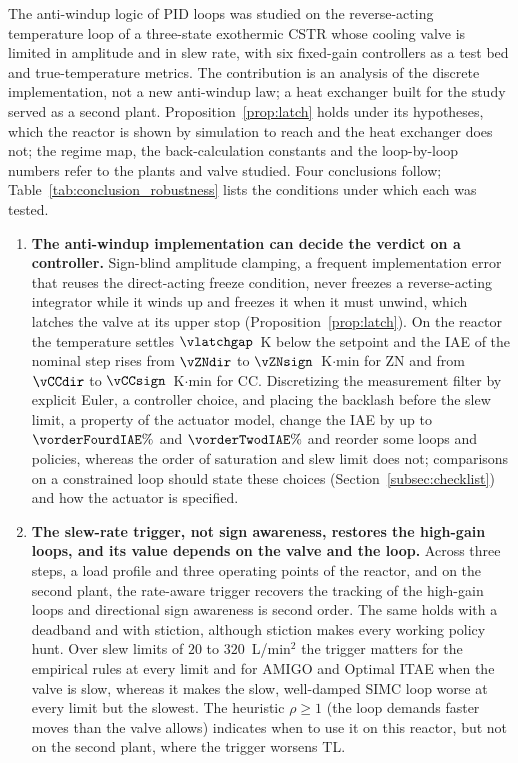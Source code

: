 The anti-windup logic of PID loops was studied on the reverse-acting temperature loop of a three-state exothermic CSTR whose cooling valve is limited in amplitude and in slew rate, with six fixed-gain controllers as a test bed and true-temperature metrics. The contribution is an analysis of the discrete implementation, not a new anti-windup law; a heat exchanger built for the study served as a second plant. Proposition~\ref{prop:latch} holds under its hypotheses, which the reactor is shown by simulation to reach and the heat exchanger does not; the regime map, the back-calculation constants and the loop-by-loop numbers refer to the plants and valve studied. Four conclusions follow; Table~\ref{tab:conclusion_robustness} lists the conditions under which each was tested.
\begin{enumerate}
    \item \textbf{The anti-windup implementation can decide the verdict on a controller.} Sign-blind amplitude clamping, a frequent implementation error that reuses the direct-acting freeze condition, never freezes a reverse-acting integrator while it winds up and freezes it when it must unwind, which latches the valve at its upper stop (Proposition~\ref{prop:latch}). On the reactor the temperature settles $\vlatchgap$~K below the setpoint and the IAE of the nominal step rises from $\vZNdir$ to $\vZNsign$~K$\cdot$min for ZN and from $\vCCdir$ to $\vCCsign$~K$\cdot$min for CC. Discretizing the measurement filter by explicit Euler, a controller choice, and placing the backlash before the slew limit, a property of the actuator model, change the IAE by up to $\vorderFourdIAE\%$ and $\vorderTwodIAE\%$ and reorder some loops and policies, whereas the order of saturation and slew limit does not; comparisons on a constrained loop should state these choices (Section~\ref{subsec:checklist}) and how the actuator is specified.
    \item \textbf{The slew-rate trigger, not sign awareness, restores the high-gain loops, and its value depends on the valve and the loop.} Across three steps, a load profile and three operating points of the reactor, and on the second plant, the rate-aware trigger recovers the tracking of the high-gain loops and directional sign awareness is second order. The same holds with a deadband and with stiction, although stiction makes every working policy hunt. Over slew limits of $20$ to $320$~L/min$^2$ the trigger matters for the empirical rules at every limit and for AMIGO and Optimal ITAE when the valve is slow, whereas it makes the slow, well-damped SIMC loop worse at every limit but the slowest. The heuristic $\rho \ge 1$ (the loop demands faster moves than the valve allows) indicates when to use it on this reactor, but not on the second plant, where the trigger worsens TL.

\end{enumerate}
